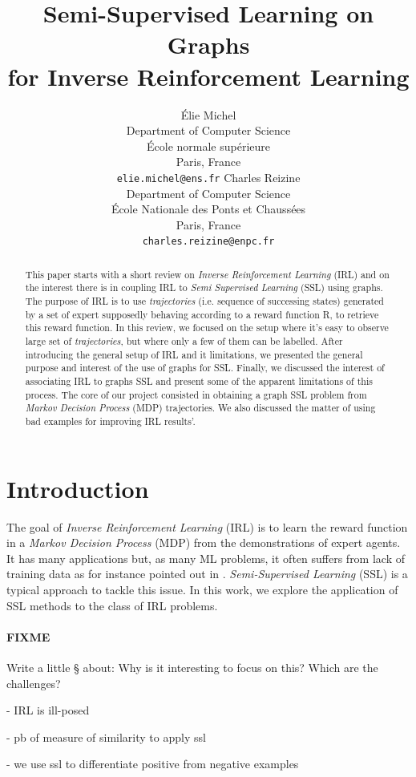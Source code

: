 \documentclass{article}
\title{Semi-Supervised Learning on Graphs \\
for Inverse Reinforcement Learning}
\author{
Élie Michel\\
Department of Computer Science\\
École normale supérieure\\
Paris, France\\
\texttt{elie.michel@ens.fr}
\And
Charles Reizine\\
Department of Computer Science\\
École Nationale des Ponts et Chaussées\\
Paris, France\\
\texttt{charles.reizine@enpc.fr}
}
\begin{document}
\maketitle

\begin{abstract}
This paper starts with a short review on \emph{Inverse Reinforcement Learning} (IRL) and on the interest there is in coupling IRL to \emph{Semi Supervised Learning} (SSL) using graphs. The purpose of IRL is to use  \emph{trajectories} (i.e. sequence of successing states) generated by a set of expert supposedly behaving according to a reward function R, to retrieve this reward function. In this review, we focused on the setup where it's easy to observe large set of \emph{trajectories}, but where only a few of them can be labelled. After introducing the general setup of IRL and it limitations, we presented the general purpose and interest of the use of graphs for SSL. Finally, we discussed the interest of associating IRL to graphs SSL and present some of the apparent limitations of this process. The core of our project consisted in obtaining a graph SSL problem from \emph{Markov Decision Process} (MDP) trajectories. We also discussed the matter of using bad examples for improving IRL results'.
\end{abstract}

\section{Introduction}

The goal of \emph{Inverse Reinforcement Learning} (IRL) is to learn the reward function in a \emph{Markov Decision Process} (MDP) from the demonstrations of expert agents. It has many applications \cite{Kaelbling96} but, as many ML problems, it often suffers from lack of training data as for instance pointed out in \cite{Vasquez14}. \emph{Semi-Supervised Learning} (SSL) is a typical approach to tackle this issue. In this work, we explore the application of SSL methods to the class of IRL problems.

\paragraph{FIXME}
Write a little § about:
Why is it interesting to focus on this?
Which are the challenges?

 - IRL is ill-posed

 - pb of measure of similarity to apply ssl
 
 - we use ssl to differentiate positive from negative examples
\end{document}
